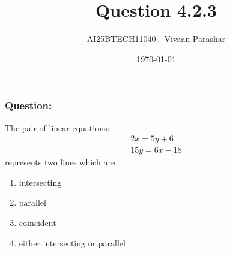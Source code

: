\documentclass{beamer}
\title{Question 4.2.3}
\author{AI25BTECH11040 - Vivaan Parashar}
\date{\today}
\begin{document}
\frame{\titlepage}

\begin{frame}
    \frametitle{Question: }
    The pair of linear equations:
    \begin{align*}
        2x = 5y + 6 \\
        15y = 6x - 18
    \end{align*}
    represents two lines which are
    \begin{enumerate}
        \item intersecting
        \item parallel
        \item coincident
        \item either intersecting or parallel
    \end{enumerate}
\end{frame}
\end{document}
